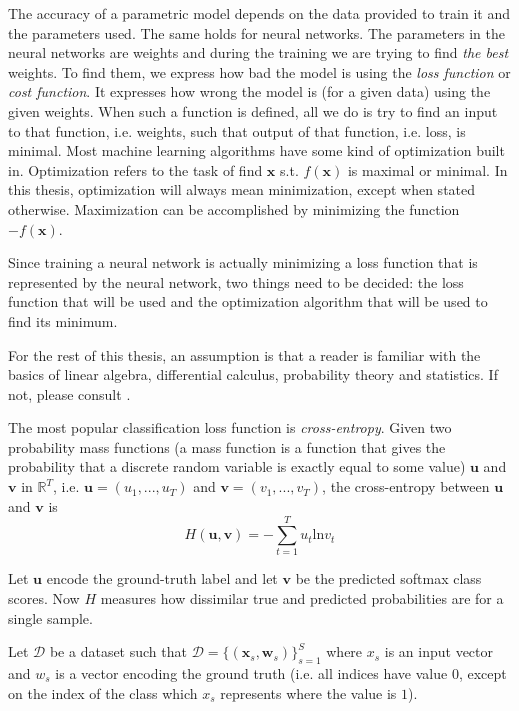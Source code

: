 The accuracy of a parametric model depends on the data provided to train it and the parameters used. The same holds for neural networks. The parameters in the neural networks are weights and during the training we are trying to find \textit{the best} weights. To find them, we express how bad the model is using the \textit{loss function} or \textit{cost function}. It expresses how wrong the model is (for a given data) using the given weights. When such a function is defined, all we do is try to find an input to that function, i.e. weights, such that output of that function, i.e. loss, is minimal. Most machine learning algorithms have some kind of optimization built in. Optimization refers to the task of find $\pmb x$ s.t. $f(\pmb x)$ is maximal or minimal. In this thesis, optimization will always mean minimization, except when stated otherwise. Maximization can be accomplished by minimizing the function $-f(\pmb x)$.

Since training a neural network is actually minimizing a loss function that is represented by the neural network, two things need to be decided: the loss function that will be used and the optimization algorithm that will be used to find its minimum.

For the rest of this thesis, an assumption is that a reader is familiar with the basics of linear algebra, differential calculus, probability theory and statistics. If not, please consult \cite{Goodfellow-et-al-2016}.

The most popular classification loss function is \textit{cross-entropy}. Given two probability mass functions (a mass function is a function that gives the probability that a discrete random variable is exactly equal to some value) $\pmb u$ and $\pmb v$ in $\mathbb{R}^T$, i.e. $\pmb u = (u_1, ..., u_T)$ and $\pmb v =  (v_1, ..., v_T)$, the cross-entropy between $\pmb u$ and $\pmb v$ is
 \begin{equation}
H (\pmb u, \pmb v)= - \sum_{t=1}^T  u_t  \text{ln} v_t 
\end{equation}

Let $\pmb u$ encode the ground-truth label and let $\pmb v$ be the predicted softmax class scores. Now $H$ measures how dissimilar true and predicted probabilities are for a single sample.

Let $\mathcal{D}$ be a dataset such that
$ \mathcal{D} = \{ (\pmb x_s, \pmb w_s)\}_{s=1}^{S}$ where $x_s$ is an input vector and $w_s$ is a vector encoding the ground truth (i.e. all indices have value $0$, except on the index of the class which $x_s$ represents where the value is $1$).

